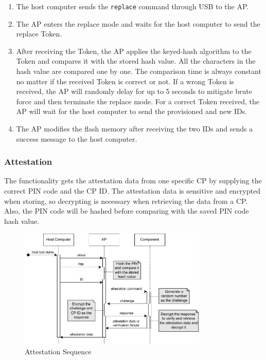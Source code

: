 \documentclass[11pt,oneside,onecolumn,letterpaper]{article}
\newcounter{alg}
\begin{document}
	\begin{enumerate}
		\item The host computer sends the \texttt{replace} command through USB to the AP.
		\item The AP enters the replace mode and waits for the host computer to send the replace Token.
		\item After receiving the Token,
		the AP applies the keyed-hash algorithm to the Token and compares it with the stored hash value.
		All the characters in the hash value are compared one by one.
		The comparison time is always constant no matter if the received Token is correct or not.
		If a wrong Token is received,
		the AP will randomly delay for up to 5 seconds to mitigate brute force and then terminate the replace mode.
		For a correct Token received,
		the AP will wait for the host computer to send the provisioned and new IDs.
		\item The AP modifies the flash memory after receiving the two IDs and sends a success message to the host computer.
	\end{enumerate}
	
	\subsubsection{Attestation}
	The functionality gets the attestation data from one specific CP by supplying the correct PIN code and the CP ID.
	The attestation data is sensitive and encrypted when storing,
	so decrypting is necessary when retrieving the data from a CP.
	Also,
	the PIN code will be hashed before comparing with the saved PIN code hash value.
	
	\begin{figure}[h]
		\centering
		\includegraphics[width=0.8\textwidth]{pics/attest.pdf}
		\caption{Attestation Sequence}
		\label{fig:functionality_attest}
	\end{figure}
	
\end{document}
